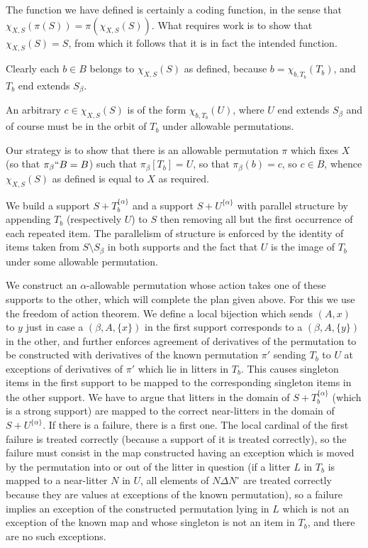 The function we have defined is certainly a coding function, in the sense that $\chi_{X,S}(\pi(S)) = \pi(\chi_{X,S}(S))$.  What requires work is to show that
$\chi_{X,S}(S)=S$, from which it follows that it is in fact the intended function.

Clearly each $b \in B$ belongs to $\chi_{X,S}(S)$ as defined, because $b = \chi_{b,T_b}(T_b)$, and $T_b$ end extends $S_\beta$.

An arbitrary $c \in \chi_{X,S}(S)$ is of the form $\chi_{b,T_b}(U)$, where $U$ end extends $S_\beta$ and of course must be in the orbit of $T_b$ under allowable permutations.

Our strategy is to show that there is an allowable permutation $\pi$ which fixes $X$ (so that $\pi_\beta``B = B$) such that $\pi_\beta[T_b]=U$, so that
$\pi_\beta(b) = c$, so $c \in B$, whence $\chi_{X,S}(S)$ as defined is equal to $X$ as required.

We build a support $S+T_b^{\{\alpha\}}$ and a support $S+U^{\{\alpha\}}$ with parallel structure by appending $T_b$ (respectively $U$) to $S$ then removing all but the first occurrence of each repeated item.  The parallelism of structure is enforced by the identity of items taken from $S \setminus S_{\beta}$
in both supports and the fact that $U$ is the image of $T_b$ under some allowable permutation.

We construct an $\alpha$-allowable permutation whose action takes one of these supports to the other, which will complete the plan given above.
For this we use the freedom of action theorem.  We define a local bijection which sends $(A,x)$ to $y$ just in case a $(\beta,A,\{x\})$ in the first support corresponds to a $(\beta,A,\{y\})$ in the other, and further enforces agreement of derivatives  of the permutation to be constructed with derivatives of the known permutation $\pi'$ sending $T_b$ to $U$ at exceptions of derivatives of $\pi'$ which lie in litters in $T_b$.  This causes singleton items in the first support to be mapped to the corresponding singleton items in the other support.  We have to argue that litters in the domain of $S+T_b^{\{\alpha\}}$ (which is a strong support) are mapped to the correct near-litters in the domain of $S+U^{\{\alpha\}}$.  If there is a failure, there is a first one.  The local cardinal of the
first failure is treated correctly (because a support of it is treated correctly), so the failure must consist in the map constructed having an exception which is moved by the permutation into or out of the litter in question (if a litter $L$ in $T_b$ is mapped to a near-litter $N$ in $U$, all elements of $N \Delta N^\circ$ are treated correctly because they are values at exceptions of the known permutation), so a failure implies an exception of the constructed permutation lying in $L$ which is not an exception of the known map and whose singleton is not an item in $T_b$, and there are no such exceptions.

